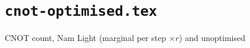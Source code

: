 \documentclass{article}
\begin{document}
\section*{\texttt{cnot-optimised.tex}}
CNOT count, Nam Light (marginal per step $\times r$) and unoptimised\par\medskip

\end{document}
